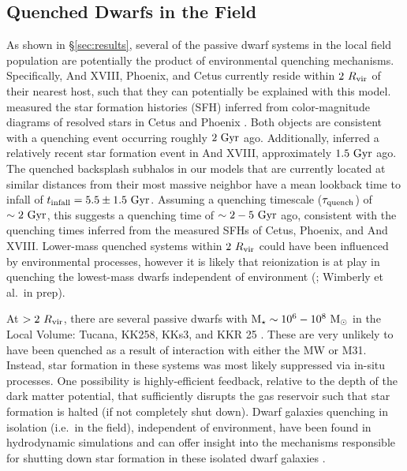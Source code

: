 \subsection{Quenched Dwarfs in the Field}
\label{subsec:weirdos}


As shown in \S\ref{sec:results}, several of the passive dwarf systems in the
local field population are potentially the product of environmental quenching
mechanisms. 
Specifically, And XVIII, Phoenix, and Cetus currently reside within
$2~R_{\rm{vir}}$ of their nearest host, such that they can potentially be
explained with this model. 
%
\citet{weisz14a} measured the star formation histories (SFH) inferred
from color-magnitude diagrams of resolved stars in Cetus and Phoenix
\citep[see also][]{hidalgo,monelli10a,monelli10b,monelli12}. 
Both objects are consistent with a quenching event occurring roughly
$2~{\rm Gyr}$ ago. 
Additionally, \citet{makarova17} inferred a relatively recent star
formation event in And XVIII, approximately $1.5~{\rm Gyr}$ ago.
%
The quenched backsplash subhalos in our models that are currently located at
similar distances from their most massive neighbor have a mean lookback time to
infall of $t_{\rm infall} = 5.5 \pm 1.5~{\rm Gyr}$. Assuming a quenching
timescale ($\tau_{\rm quench}$) of $\sim 2~{\rm Gyr}$, this suggests a quenching
time of $\sim 2-5~{\rm Gyr}$ ago, consistent with the quenching times inferred
from the measured SFHs of Cetus, Phoenix, and And XVIII.
%
Lower-mass quenched systems within $2~R_{\rm{vir}}$ \citep[e.g.~Eri~II,][]{DES15,
  koposov15} could have been influenced by environmental processes, however it is
likely that reionization is at play in quenching the lowest-mass dwarfs
independent of environment (\citealt{brown14}; Wimberly et al.~in prep).





At $>2~R_{\rm{vir}}$, there are several passive dwarfs with
${\rm M}_{\star} \sim 10^{6}-10^{8}~{\rm M}_{\odot}$ in the Local Volume: Tucana, KK258, KKs3, and
KKR 25 \citep{lavery92, makarov12, weisz14a, karachentsev14b, karachentsev15b,
  karachentsev15a}. These are very unlikely to have been quenched as a result of
interaction with either the MW or M31. Instead, star formation in these systems
was most likely suppressed via in-situ processes. One possibility is
highly-efficient feedback, relative to the depth of the dark matter potential,
that sufficiently disrupts the gas reservoir such that star formation is halted
(if not completely shut down). 
%
 Dwarf galaxies quenching in isolation (i.e.~in the field),
 independent of environment, have been found in hydrodynamic
 simulations and can offer insight into the mechanisms responsible for
 shutting down star formation in these isolated dwarf galaxies
 \citep[e.g.][]{fitts17}.  




